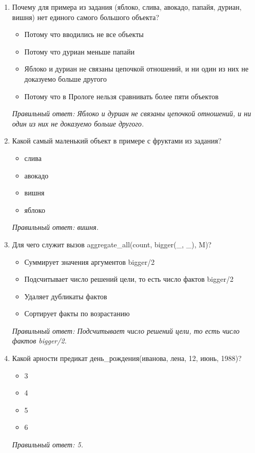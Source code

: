 \begin{enumerate}[label=\textbf{\arabic*.}, leftmargin=0pt, itemsep=1.2em]
\item Почему для примера из задания (яблоко, слива, авокадо, папайя, дуриан, вишня) нет единого самого большого объекта?
\begin{itemize}[label=$\square$, leftmargin=1.5cm, itemsep=0.2em, topsep=0.3em]
\item Потому что вводились не все объекты
\item Потому что дуриан меньше папайи
\item Яблоко и дуриан не связаны цепочкой отношений, и ни один из них не доказуемо больше другого
\item Потому что в Прологе нельзя сравнивать более пяти объектов
\end{itemize}
{\small\textit{Правильный ответ: Яблоко и дуриан не связаны цепочкой отношений, и ни один из них не доказуемо больше другого.}}

\item Какой самый маленький объект в примере с фруктами из задания?
\begin{itemize}[label=$\square$, leftmargin=1.5cm, itemsep=0.2em, topsep=0.3em]
\item слива
\item авокадо
\item вишня
\item яблоко
\end{itemize}
{\small\textit{Правильный ответ: вишня.}}

\item Для чего служит вызов aggregate\_all(count, bigger(\_, \_), M)?
\begin{itemize}[label=$\square$, leftmargin=1.5cm, itemsep=0.2em, topsep=0.3em]
\item Суммирует значения аргументов bigger/2
\item Подсчитывает число решений цели, то есть число фактов bigger/2
\item Удаляет дубликаты фактов
\item Сортирует факты по возрастанию
\end{itemize}
{\small\textit{Правильный ответ: Подсчитывает число решений цели, то есть число фактов bigger/2.}}

\item Какой арности предикат день\_рождения(иванова, лена, 12, июнь, 1988)?
\begin{itemize}[label=$\square$, leftmargin=1.5cm, itemsep=0.2em, topsep=0.3em]
\item 3
\item 4
\item 5
\item 6
\end{itemize}
{\small\textit{Правильный ответ: 5.}}


\end{enumerate}
